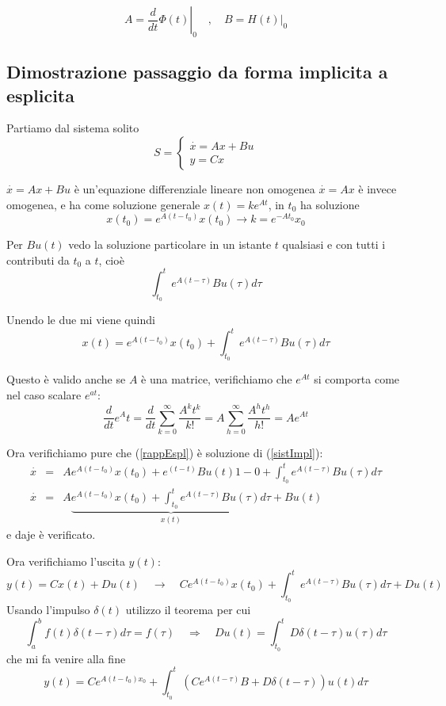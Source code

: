 \documentclass{article}
\begin{document}
\[ A = \left.\frac{d}{dt}\Phi(t)\right|_{0} \quad,\quad B = \left.H(t)\right|_{0} \]


\subsection{Dimostrazione passaggio da forma implicita a esplicita}

Partiamo dal sistema solito 
\begin{equation}\label{sistImpl}
    S = \begin{cases} \overset{\cdot}{x} = Ax+Bu\\ y = Cx \end{cases}
\end{equation}

$\overset{\cdot}{x} = Ax+Bu$ è un'equazione differenziale lineare non omogenea
$\overset{\cdot}{x} = Ax$ è invece omogenea, e ha come soluzione generale $x(t) = ke^{At}$,
in $t_0$ ha soluzione 
\[ x(t_0) = e^{A(t-t_0)}x(t_0) \to k = e^{-At_0}x_0 \]

Per $Bu(t)$ vedo la soluzione particolare in un istante $t$ qualsiasi e con tutti i contributi da $t_0$ a $t$, cioè
\[ \int_{t_0}^{t}e^{A(t-\tau)}Bu(\tau)d\tau \]

Unendo le due mi viene quindi 
\begin{equation}\label{rappEspl}
    x(t) = e^{A(t-t_0)}x(t_0)+\int_{t_0}^{t}e^{A(t-\tau)}Bu(\tau)d\tau
\end{equation}

Questo è valido anche se $A$ è una matrice, verifichiamo che $e^{At}$ si comporta come nel caso
scalare $e^{at}$:
\[
\frac{d}{dt}e^At =     \frac{d}{dt}\sum_{k=0}^{\infty}\frac{A^kt^k}{k!} =
 A\sum_{h=0}^{\infty}\frac{A^ht^h}{h!} = Ae^{At}
\]

Ora verifichiamo pure che (\ref{rappEspl}) è soluzione di  (\ref{sistImpl}): 
\begin{align*}
    \overset{\cdot}{x} &=& Ae^{A(t-t_0)}x(t_0)+e^{(t-t)}B u(t) 1 - 0 + \int_{t_0}^{t}e^{A(t-\tau)}Bu(\tau)d\tau\\
    \overset{\cdot}{x} &=& A\underbrace{e^{A(t-t_0)}x(t_0)+ \int_{t_0}^{t}e^{A(t-\tau)}Bu(\tau)d\tau}_{x(t)}+Bu(t)
\end{align*}
e daje è verificato.


Ora verifichiamo l'uscita $y(t)$:
\[
y(t) =Cx(t)+Du(t) \quad \to\quad Ce^{A(t-t_0)}x(t_0)+    \int_{t_0}^{t}e^{A(t-\tau)}Bu(\tau)d\tau+Du(t)
\]
Usando l'impulso $\delta(t)$ utilizzo il teorema per cui
\[
\int_{a}^{b}f(t)\delta(t-\tau)d\tau = f(\tau) \quad\Longrightarrow\quad
Du(t) =   \int_{t_0}^{t} D\delta(t-\tau)u(\tau)d\tau
\]
che mi fa venire alla fine 
\[
    y(t) = Ce^{A(t-t_0)x_0}+\int_{t_0}^{t} \left(Ce^{A(t-\tau)}B+D\delta(t-\tau)\right)u(t)d\tau
\]
\end{document}
